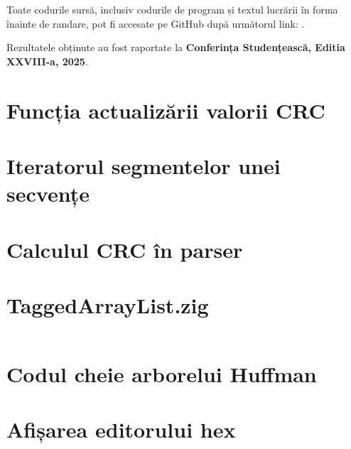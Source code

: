\documentclass[a4paper,12pt]{report}
\renewcommand{\year}{2025}
\newcommand{\conferencesList}{Conferința Studențească, Editia XXVIII-a, \year}
\newcommand{\github}{\url{                           }}
\begin{document}
Toate codurile sursă, inclusiv codurile de program și textul lucrării
în forma înainte de randare, pot fi accesate pe GitHub după următorul link: \github.

Rezultatele obținute au fost raportate la \textbf{\conferencesList}\cite{self}.

\newpage
{}





\appendix


\section{Funcția actualizării valorii CRC}\label{appendix:crc} %

\section{Iteratorul segmentelor unei secvențe}\label{appendix:sequence_iterator} %

\section{Calculul CRC în parser}\label{appendix:crc_sequence_defer_example} %

\section{TaggedArrayList.zig}\label{appendix:main__TaggedArrayList} %
\inputminted{zig}{../src/TaggedArrayList.zig}

\section{Codul cheie arborelui Huffman}\label{appendix:huffman_tree}%

\section{Afișarea editorului hex}\label{appendix:draw_hex_grid}%
\end{document}
